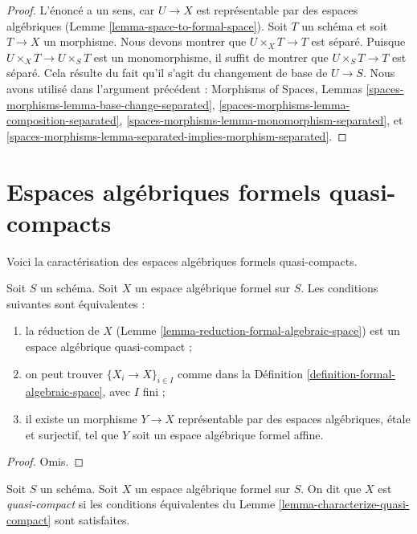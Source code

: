 \begin{proof}
L'énoncé a un sens, car $U \to X$ est représentable par des
espaces algébriques (Lemme \ref{lemma-space-to-formal-space}).
Soit $T$ un schéma et soit $T \to X$ un morphisme. Nous devons montrer
que $U \times_X T \to T$ est séparé. Puisque $U \times_X T \to U \times_S T$
est un monomorphisme, il suffit de montrer que $U \times_S T \to T$
est séparé. Cela résulte du fait qu'il s'agit du changement de base de $U \to S$.
Nous avons utilisé dans l'argument précédent :
Morphisms of Spaces, Lemmas
\ref{spaces-morphisms-lemma-base-change-separated},
\ref{spaces-morphisms-lemma-composition-separated},
\ref{spaces-morphisms-lemma-monomorphism-separated}, et
\ref{spaces-morphisms-lemma-separated-implies-morphism-separated}.
\end{proof}




\section{Espaces algébriques formels quasi-compacts}
\label{section-quasi-compact}

\noindent
Voici la caractérisation des espaces algébriques formels
quasi-compacts.

\begin{lemma}
\label{lemma-characterize-quasi-compact}
Soit $S$ un schéma. Soit $X$ un espace algébrique formel sur $S$.
Les conditions suivantes sont équivalentes :
\begin{enumerate}
\item la réduction de $X$
(Lemme \ref{lemma-reduction-formal-algebraic-space}) est un espace
algébrique quasi-compact ;
\item on peut trouver $\{X_i \to X\}_{i \in I}$ comme dans la
Définition \ref{definition-formal-algebraic-space}, avec $I$ fini ;
\item il existe un morphisme $Y \to X$ représentable par des espaces
algébriques, étale et surjectif, tel que
$Y$ soit un espace algébrique formel affine.
\end{enumerate}
\end{lemma}

\begin{proof}
Omis.
\end{proof}

\begin{definition}
\label{definition-quasi-compact}
Soit $S$ un schéma. Soit $X$ un espace algébrique formel sur $S$.
On dit que $X$ est {\it quasi-compact} si les conditions équivalentes du
Lemme \ref{lemma-characterize-quasi-compact} sont satisfaites.
\end{definition}

